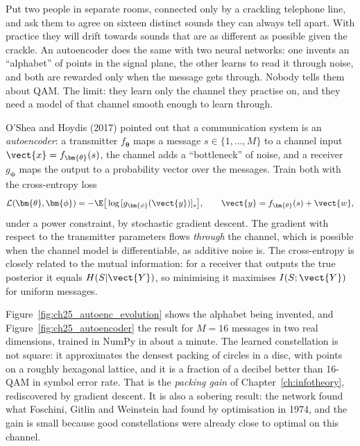 \begin{analogy}
Put two people in separate rooms, connected only by a crackling telephone line, and ask them to
agree on sixteen distinct sounds they can always tell apart. With practice they will drift towards
sounds that are as different as possible given the crackle. An autoencoder does the same with two
neural networks: one invents an ``alphabet'' of points in the signal plane, the other learns to read
it through noise, and both are rewarded only when the message gets through. Nobody tells them about
QAM. The limit: they learn only the channel they practise on, and they need a model of that channel
smooth enough to learn through.
\end{analogy}

O'Shea and Hoydis (2017) pointed out that a communication system is an \emph{autoencoder}: a
transmitter $f_{\bm{\theta}}$ maps a message $s\in\{1,\dots,M\}$ to a channel input
$\vect{x}=f_{\bm{\theta}}(s)$, the channel adds a ``bottleneck'' of noise, and a receiver
$g_{\bm{\phi}}$ maps the output to a probability vector over the messages. Train both with the
cross-entropy loss
\begin{equation}
\mathcal{L}(\bm{\theta},\bm{\phi})=-\E\big[\log\,[g_{\bm{\phi}}(\vect{y})]_s\big],\qquad
\vect{y}=f_{\bm{\theta}}(s)+\vect{w},
\label{eq:ch25:autoenc}
\end{equation}
under a power constraint, by stochastic gradient descent. The gradient with respect to the
transmitter parameters flows \emph{through} the channel, which is possible when the channel model is
differentiable, as additive noise is. The cross-entropy is closely related to the mutual information:
for a receiver that outputs the true posterior it equals $H(S|\vect{Y})$, so minimising it maximises
$I(S;\vect{Y})$ for uniform messages.

Figure~\ref{fig:ch25_autoenc_evolution} shows the alphabet being invented, and
Figure~\ref{fig:ch25_autoencoder} the result for $M=16$ messages in two real dimensions, trained in
NumPy in about a minute. The learned constellation is not square: it approximates the densest
packing of circles in a disc, with points on a roughly hexagonal lattice, and it is a fraction of a
decibel better than 16-QAM in symbol error rate. That is the \emph{packing gain} of
Chapter~\ref{ch:infotheory}, rediscovered by gradient descent. It is also a sobering result: the
network found what Foschini, Gitlin and Weinstein had found by optimisation in 1974, and the gain is
small because good constellations were already close to optimal on this channel.

